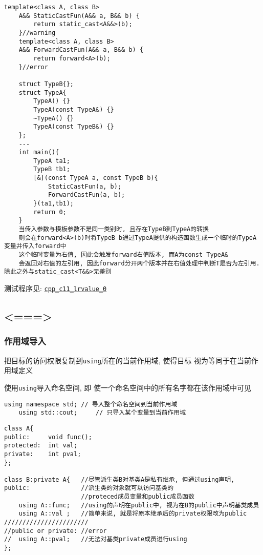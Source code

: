 \begin{lstlisting}[xleftmargin=2em,xrightmargin=2em,title=特殊情况]
	template<class A, class B>
	A&& StaticCastFun(A&& a, B&& b) {
		return static_cast<A&&>(b);
	}//warning
	template<class A, class B>
	A&& ForwardCastFun(A&& a, B&& b) {
		return forward<A>(b);
	}//error

	struct TypeB{};
	struct TypeA{
		TypeA() {}
		TypeA(const TypeA&) {}
		~TypeA() {}
		TypeA(const TypeB&) {}
	};
	---
	int main(){
		TypeA ta1;
		TypeB tb1;
		[&](const TypeA a, const TypeB b){
			StaticCastFun(a, b);
			ForwardCastFun(a, b);
		}(ta1,tb1);
		return 0;
	}
	当传入参数与模板参数不是同一类别时, 且存在TypeB到TypeA的转换
	则会在forward<A>(b)时将TypeB b通过TypeA提供的构造函数生成一个临时的TypeA变量并传入forward中
	这个临时变量为右值, 因此会触发forward右值版本, 而A为const TypeA&
	会返回对右值的左引用, 因此forward分开两个版本并在右值处理中判断T是否为左引用. 除此之外与static_cast<T&&>无差别

\end{lstlisting}
测试程序见: \href{https://github.com/wenqingqian/Obtuse/tree/main/test/cpp/c++11/lrvalue_0}{\tt cpp\_c11\_lrvalue\_0}
\subsection{<===>\color{purple}{\tt using}}
\subsubsection{作用域导入}
把目标的访问权限复制到{\tt using}所在的当前作用域, 
	使得目标 视为等同于在当前作用域定义

使用{\tt using}导入命名空间, 即 使一个命名空间中的所有名字都在该作用域中可见
\begin{lstlisting}[xleftmargin=5em,xrightmargin=5em]
	using namespace std; // 导入整个命名空间到当前作用域
	using std::cout;     // 只导入某个变量到当前作用域 
\end{lstlisting}


\begin{lstlisting}[title=在派生类中引用基类成员]
class A{
public:		void func();
protected:	int val;
private:	int pval;
};

class B:private A{   //尽管派生类B对基类A是私有继承, 但通过using声明,
public:			     //派生类的对象就可以访问基类的
					 //proteced成员变量和public成员函数
	using A::func;   //using的声明在public中, 视为在B的public中声明基类成员
	using A::val ;   //简单来说, 就是将原本继承后的private权限改为public
///////////////////////	
//public or private: //error	
//	using A::pval;   //无法对基类private成员进行using
};
\end{lstlisting}
